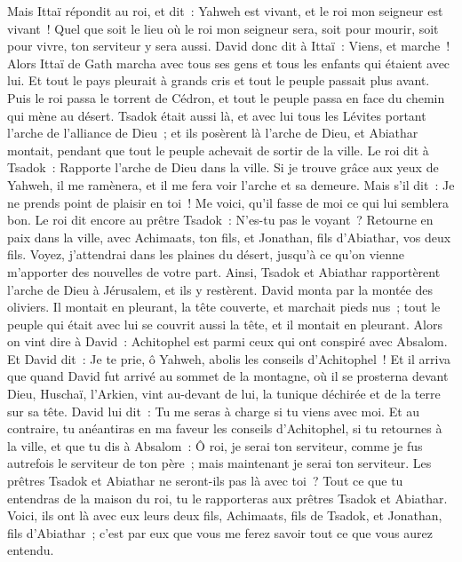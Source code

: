 \begin{multicols}{2}
Mais Ittaï répondit au roi, et dit~: Yahweh est vivant, et le roi mon seigneur est vivant~! Quel que soit le lieu où le roi mon seigneur sera, soit pour mourir, soit pour vivre, ton serviteur y sera aussi.
David donc dit à Ittaï~: Viens, et marche~! Alors Ittaï de Gath marcha avec tous ses gens et tous les enfants qui étaient avec lui.
Et tout le pays pleurait à grands cris et tout le peuple passait plus avant. Puis le roi passa le torrent de Cédron, et tout le peuple passa en face du chemin qui mène au désert.
Tsadok était aussi là, et avec lui tous les Lévites portant l'arche de l'alliance de Dieu~; et ils posèrent là l'arche de Dieu, et Abiathar montait, pendant que tout le peuple achevait de sortir de la ville.
Le roi dit à Tsadok~: Rapporte l'arche de Dieu dans la ville. Si je trouve grâce aux yeux de Yahweh, il me ramènera, et il me fera voir l'arche et sa demeure.
Mais s'il dit~: Je ne prends point de plaisir en toi~! Me voici, qu'il fasse de moi ce qui lui semblera bon.
Le roi dit encore au prêtre Tsadok~: N'es-tu pas le voyant~? Retourne en paix dans la ville, avec Achimaats, ton fils, et Jonathan, fils d'Abiathar, vos deux fils.
Voyez, j'attendrai dans les plaines du désert, jusqu'à ce qu'on vienne m'apporter des nouvelles de votre part.
Ainsi, Tsadok et Abiathar rapportèrent l'arche de Dieu à Jérusalem, et ils y restèrent.
David monta par la montée des oliviers. Il montait en pleurant, la tête couverte, et marchait pieds nus~; tout le peuple qui était avec lui se couvrit aussi la tête, et il montait en pleurant.
Alors on vint dire à David~: Achitophel est parmi ceux qui ont conspiré avec Absalom. Et David dit~: Je te prie, ô Yahweh, abolis les conseils d'Achitophel~!
Et il arriva que quand David fut arrivé au sommet de la montagne, où il se prosterna devant Dieu, Huschaï, l'Arkien, vint au-devant de lui, la tunique déchirée et de la terre sur sa tête.
David lui dit~: Tu me seras à charge si tu viens avec moi.
Et au contraire, tu anéantiras en ma faveur les conseils d'Achitophel, si tu retournes à la ville, et que tu dis à Absalom~: Ô roi, je serai ton serviteur, comme je fus autrefois le serviteur de ton père~; mais maintenant je serai ton serviteur.
Les prêtres Tsadok et Abiathar ne seront-ils pas là avec toi~? Tout ce que tu entendras de la maison du roi, tu le rapporteras aux prêtres Tsadok et Abiathar.
Voici, ils ont là avec eux leurs deux fils, Achimaats, fils de Tsadok, et Jonathan, fils d'Abiathar~; c'est par eux que vous me ferez savoir tout ce que vous aurez entendu.

\end{multicols}
